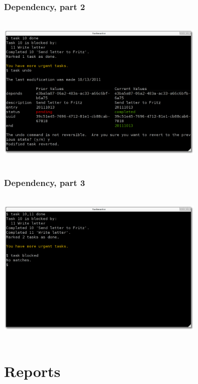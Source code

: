 \documentclass[t,handout]{beamer}
\begin{document}
\begin{frame}
\frametitle{Dependency, part 2}
\begin{center}
\includegraphics[width=10cm,height=7.5cm]{dependency02.png}
\end{center}
\end{frame}

\begin{frame}
\frametitle{Dependency, part 3}
\begin{center}
\includegraphics[width=10cm,height=7.5cm]{dependency03.png}
\end{center}
\end{frame}

\section{Reports}
\end{document}
